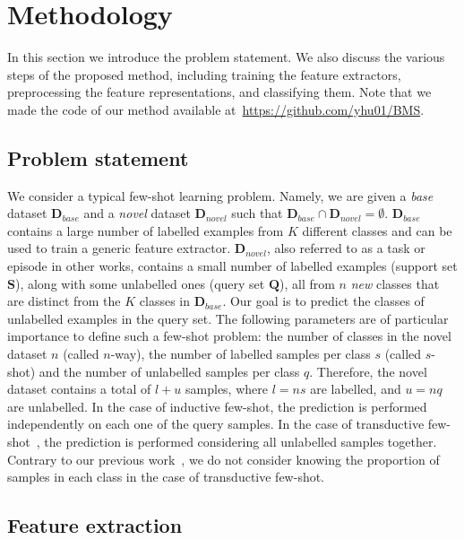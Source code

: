 \documentclass[review]{elsarticle}
\begin{document}
\section{Methodology}
\label{methodology}

In this section we introduce the problem statement. We also discuss the various steps of the proposed method, including training the feature extractors, preprocessing the feature representations, and classifying them. Note that we made the code of our method available at~\url{https://github.com/yhu01/BMS}.

\subsection{Problem statement}

We consider a typical few-shot learning problem. Namely, we are given a \emph{base} dataset $\mathbf{D}_{base}$ and a \emph{novel} dataset $\mathbf{D}_{novel}$ such that $\mathbf{D}_{base}\cap\mathbf{D}_{novel}=\emptyset$. $\mathbf{D}_{base}$ contains a large number of labelled examples from $K$ different classes and can be used to train a generic feature extractor. $\mathbf{D}_{novel}$, also referred to as a task or episode in other works, contains a small number of labelled examples (support set $\mathbf{S}$), along with some unlabelled ones (query set $\mathbf{Q}$), all from $n$ \emph{new} classes that are distinct from the $K$ classes in $\mathbf{D}_{base}$. Our goal is to predict the classes of unlabelled examples in the query set. The following parameters are of particular importance to define such a few-shot problem: the number of classes in the novel dataset $n$ (called $n$-way), the number of labelled samples per class $s$ (called $s$-shot) and the number of unlabelled samples per class $q$. Therefore, the novel dataset contains a total of $l+u$ samples, where $l=ns$ are labelled, and $u=nq$ are unlabelled.
In the case of inductive few-shot, the prediction is performed independently on each one of the query samples. In the case of transductive few-shot~\cite{DBLP:conf/iclr/LiuLPKYHY19, lichtenstein2020tafssl}, the prediction is performed considering all unlabelled samples together. Contrary to our previous work~\cite{hu2021leveraging}, we do not consider knowing the proportion of samples in each class in the case of transductive few-shot.

\subsection{Feature extraction}
\end{document}
